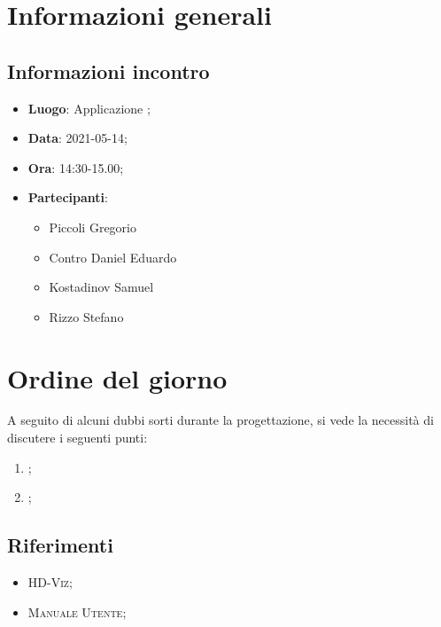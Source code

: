 \documentclass{article}
\begin{document}


\section{Informazioni generali}
\label{sec:info_generali}

\subsection{Informazioni incontro}
\label{sub:info_incontro}

\begin{itemize}
	\item \textbf{Luogo}: Applicazione ;
	\item \textbf{Data}: 2021-05-14;
	\item \textbf{Ora}: 14:30-15.00;
	\item \textbf{Partecipanti}:
	\begin{itemize}
		\item Piccoli Gregorio
		\item Contro Daniel Eduardo
		\item Kostadinov Samuel
		\item Rizzo Stefano

	\end{itemize}
\end{itemize}

\section{Ordine del giorno}%
\label{sec:ordine_del_giorno}
A seguito di alcuni dubbi sorti durante la progettazione, si vede la necessità di discutere i seguenti punti:
\begin{enumerate}
	\item {};
	\item {};
\end{enumerate}


\subsection{Riferimenti}%
\label{sub:riferimenti}
\begin{itemize}
    \item \textsc{HD-Viz};
    \item \textsc{Manuale Utente};
    \end{itemize}

\newpage
\end{document}
